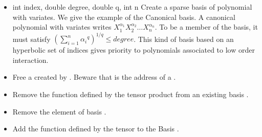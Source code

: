 \begin{itemize}
\item  {}
  {int index, double degree, double q, int n}
  \sshortdescribe Create a sparse basis of polynomial with 
  variates. We give the example of the Canonical basis. A canonical polynomial
  with  variates writes $X_1^{\alpha_1} X_2^{\alpha_2} \dots
  X_n^{\alpha_n}$. To be a member of the basis, it must satisfy $\left(\sum_{i=1}^n
    {\alpha_i}^q \right)^{1/q} \leq degree$. This kind of basis based on an
  hyperbolic set of indices gives priority to polynomials associated to low
  order interaction.

\item  {}
  \sshortdescribe Free a \PnlBasis created by
  . Beware that  is the address of a
  \PnlBasis\ptr.


\item {}
  \sshortdescribe Remove the function defined by the tensor product  from
  an existing basis .

\item {}
  \sshortdescribe Remove the  element of basis .

\item {}
  \sshortdescribe Add the function defined by the tensor  to the Basis .


\end{itemize}


